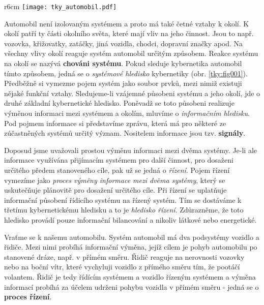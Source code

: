{      \begin{wrapfigure}[11]{r}{6cm}   %
        \centering
        \texttt{[image: tky\_automobil.pdf]}
        \caption{ }
        \label{tky:fig001} 
      \end{wrapfigure} 
      Automobil není izolovaným systémem a proto má také četné vztahy k okolí. K okolí  patří ty části okolního světa, které mají vliv na jeho činnost. Jsou to např. 
      vozovka, křižovatky, zatáčky, jiná vozidla, chodci, dopravní značky apod. Na všechny vlivy 
      okolí reaguje systém automobil určitým způsobem. Reakce systému na okolí se nazývá 
      \textbf{chováni systému}. Pokud sleduje kybernetika automobil tímto způsobem, jedná se o 
      \emph{systémové hledisko} kybernetiky  (obr. \ref{tky:fig001}). Předběžně si vymezme pojem 
      systém jako soubor prvků, mezi nimiž existuji nějaké funkční vztahy. Sledujeme-li vzájemné 
      působeni systému a jeho okolí, jde o druhé základní kybernetické hledisko. Poněvadž se toto 
      působeni realizuje výměnou informaci mezi systémem a okolím, mluvíme o \emph{informačním 
      hledisku}. Pod pojmem informace si představíme zprávu, která má pro některé ze zúčastněných 
      systémů určitý význam. Nositelem informace jsou tzv. \textbf{signály}.
      
      Doposud jsme uvažovali prostou výměnu informaci mezi dvěma systémy. Je-li ale informace 
      využívána přijímacím systémem pro další činnost, pro dosaženi určitého předem stanoveného 
      cíle, pak už se jedná o \emph{řízení}. Pojem řízení vymezíme jako \emph{proces výměny 
      informace mezi dvěma systémy}, který se uskutečňuje plánovitě pro dosažení určitého cíle. Při 
      řízení se uplatňuje informační působení řídicího systému na řízený systém. Tím se dostáváme k 
      třetímu kybernetickému hledisku a to je \emph{hledisko řízení}. Zdůrazněme, že toto hledisko 
      provádí pouze informační bilancování a nikoliv látkové nebo energetické.
      
      Vraťme se k našemu automobilu. Systém automobil má dva podsystémy vozidlo a řidiče. Mezi nimi 
      probíhá informační výměna, jejíž cílem je pohyb automobilu po stanovené dráze, např. v přímém 
      směru. Řidič reaguje na nerovnosti vozovky nebo na boční vítr, které vychyluji vozidlo z 
      přímého směru tím, že pootáčí volantem. Řidič je tedy řídícím systémem a vozidlo řízeným 
      systémem a výměna informací probíhá za účelem udrženi pohybu vozidla v přímém směru - jedná 
      se o \textbf{proces řízení}.
      
}
